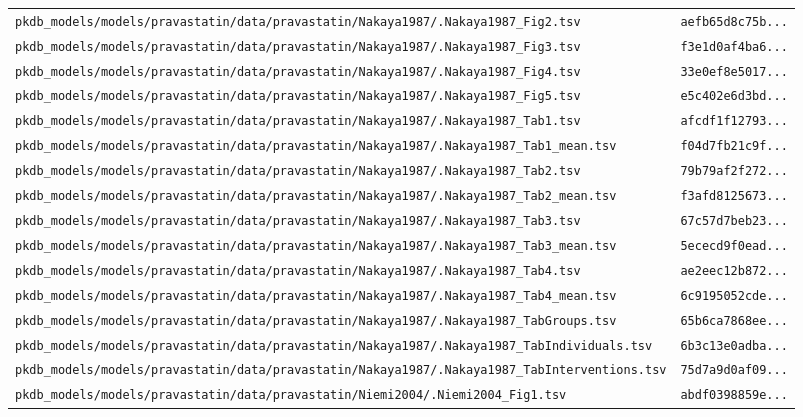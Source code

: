 \begin{longtable}{ll}
\texttt{pkdb\_models/models/pravastatin/data/pravastatin/Nakaya1987/.Nakaya1987\_Fig2.tsv} & \texttt{aefb65d8c75b...} \\
\texttt{pkdb\_models/models/pravastatin/data/pravastatin/Nakaya1987/.Nakaya1987\_Fig3.tsv} & \texttt{f3e1d0af4ba6...} \\
\texttt{pkdb\_models/models/pravastatin/data/pravastatin/Nakaya1987/.Nakaya1987\_Fig4.tsv} & \texttt{33e0ef8e5017...} \\
\texttt{pkdb\_models/models/pravastatin/data/pravastatin/Nakaya1987/.Nakaya1987\_Fig5.tsv} & \texttt{e5c402e6d3bd...} \\
\texttt{pkdb\_models/models/pravastatin/data/pravastatin/Nakaya1987/.Nakaya1987\_Tab1.tsv} & \texttt{afcdf1f12793...} \\
\texttt{pkdb\_models/models/pravastatin/data/pravastatin/Nakaya1987/.Nakaya1987\_Tab1\_mean.tsv} & \texttt{f04d7fb21c9f...} \\
\texttt{pkdb\_models/models/pravastatin/data/pravastatin/Nakaya1987/.Nakaya1987\_Tab2.tsv} & \texttt{79b79af2f272...} \\
\texttt{pkdb\_models/models/pravastatin/data/pravastatin/Nakaya1987/.Nakaya1987\_Tab2\_mean.tsv} & \texttt{f3afd8125673...} \\
\texttt{pkdb\_models/models/pravastatin/data/pravastatin/Nakaya1987/.Nakaya1987\_Tab3.tsv} & \texttt{67c57d7beb23...} \\
\texttt{pkdb\_models/models/pravastatin/data/pravastatin/Nakaya1987/.Nakaya1987\_Tab3\_mean.tsv} & \texttt{5ececd9f0ead...} \\
\texttt{pkdb\_models/models/pravastatin/data/pravastatin/Nakaya1987/.Nakaya1987\_Tab4.tsv} & \texttt{ae2eec12b872...} \\
\texttt{pkdb\_models/models/pravastatin/data/pravastatin/Nakaya1987/.Nakaya1987\_Tab4\_mean.tsv} & \texttt{6c9195052cde...} \\
\texttt{pkdb\_models/models/pravastatin/data/pravastatin/Nakaya1987/.Nakaya1987\_TabGroups.tsv} & \texttt{65b6ca7868ee...} \\
\texttt{pkdb\_models/models/pravastatin/data/pravastatin/Nakaya1987/.Nakaya1987\_TabIndividuals.tsv} & \texttt{6b3c13e0adba...} \\
\texttt{pkdb\_models/models/pravastatin/data/pravastatin/Nakaya1987/.Nakaya1987\_TabInterventions.tsv} & \texttt{75d7a9d0af09...} \\
\texttt{pkdb\_models/models/pravastatin/data/pravastatin/Niemi2004/.Niemi2004\_Fig1.tsv} & \texttt{abdf0398859e...} \\

\end{longtable}
